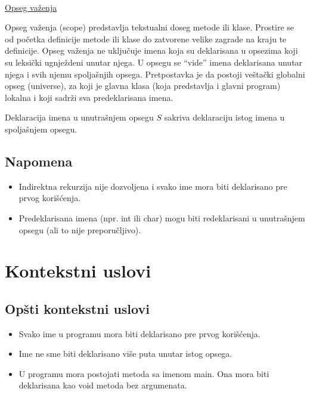 \hspace{0pt} \\

\underline{Opseg važenja}

Opseg važenja (scope) predstavlja tekstualni doseg metode ili klase. Prostire se od početka definicije 
metode ili klase do zatvorene velike zagrade na kraju te definicije. Opseg važenja ne uključuje imena 
koja su deklarisana u opsezima koji su leksički ugnježdeni unutar njega. U opsegu se “vide” imena 
deklarisana unutar njega i svih njemu spoljašnjih opsega. Pretpostavka je da postoji veštački globalni 
opseg (universe), za koji je glavna klasa (koja predstavlja i glavni program) lokalna i koji sadrži sva 
predeklarisana imena.  

Deklaracija imena u unutrašnjem opsegu $S$ sakriva deklaraciju istog imena u spoljašnjem opsegu. 
 
\subsection*{Napomena}
 
\begin{itemize}
\item Indirektna rekurzija nije dozvoljena i svako ime mora biti deklarisano pre prvog korišćenja.  
\item Predeklarisana imena (npr. int ili char) mogu biti redeklarisani u unutrašnjem opsegu (ali to nije 
preporučljivo).  
\end{itemize} 
 
\section{Kontekstni uslovi}
 
\subsection*{Opšti kontekstni uslovi}

\begin{itemize}
\item Svako ime u programu mora biti deklarisano pre prvog korišćenja. 
\item Ime ne sme biti deklarisano više puta unutar istog opsega. 
\item U programu mora postojati metoda sa imenom main. Ona mora biti deklarisana kao void metoda bez 
argumenata. 
\end{itemize}

